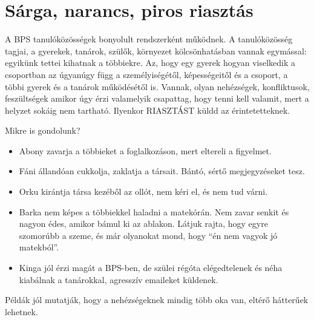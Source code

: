 \hypertarget{sarga-narancs-piros-riasztas}{%
\section{Sárga, narancs, piros
riasztás}\label{sarga-narancs-piros-riasztas}}

A BPS tanulóközösségek bonyolult rendszerként működnek. A tanulóközösség
tagjai, a gyerekek, tanárok, szülők, környezet kölcsönhatásban vannak
egymással: egyikünk tettei kihatnak a többiekre. Az, hogy egy gyerek
hogyan viselkedik a csoportban az úgyanúgy függ a személyiségétől,
képességeitől és a csoport, a többi gyerek és a tanárok működésétől is.
Vannak, olyan nehézségek, konfliktusok, feszültségek amikor úgy érzi
valamelyik csapattag, hogy tenni kell valamit, mert a helyzet sokáig nem
tartható. Ilyenkor RIASZTÁST küldd az érintetetteknek.

Mikre is gondolunk?

\begin{itemize}
\tightlist
\item
  Abony zavarja a többieket a foglalkozáson, mert eltereli a figyelmet.
\item
  Fáni állandóan cukkolja, zaklatja a társait. Bántó, sértő
  megjegyzéseket tesz.
\item
  Orku kirántja társa kezéből az ollót, nem kéri el, és nem tud várni.
\item
  Barka nem képes a többiekkel haladni a matekórán. Nem zavar senkit és
  nagyon édes, amikor bámul ki az ablakon. Látjuk rajta, hogy egyre
  szomorúbb a szeme, és már olyanokat mond, hogy ``én nem vagyok jó
  matekból''.
\item
  Kinga jól érzi magát a BPS-ben, de szülei régóta elégedtelenek és néha
  kiabálnak a tanárokkal, agresszív emaileket küldenek.
\end{itemize}

Példák jól mutatják, hogy a nehézségeknek mindig több oka van, eltérő
hátterűek lehetnek.

